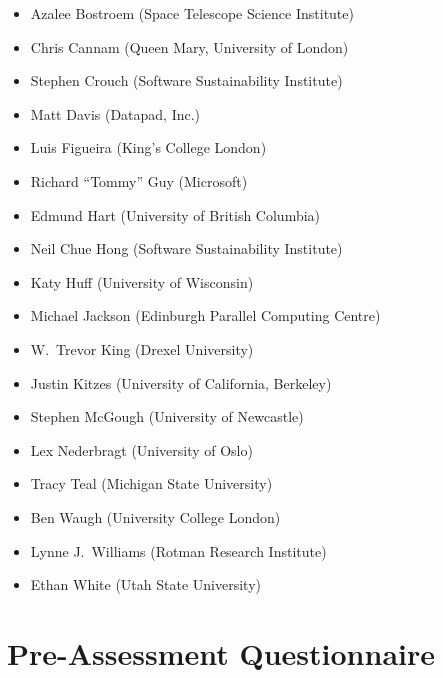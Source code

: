 \documentclass[10pt,a4paper,twocolumn]{article}
\begin{document}
\begin{itemize}
\item
  Azalee Bostroem (Space Telescope Science Institute)
\item
  Chris Cannam (Queen Mary, University of London)
\item
  Stephen Crouch (Software Sustainability Institute)
\item
  Matt Davis (Datapad, Inc.)
\item
  Luis Figueira (King's College London)
\item
  Richard ``Tommy'' Guy (Microsoft)
\item
  Edmund Hart (University of British Columbia)
\item
  Neil Chue Hong (Software Sustainability Institute)
\item
  Katy Huff (University of Wisconsin)
\item
  Michael Jackson (Edinburgh Parallel Computing Centre)
\item
  W.\ Trevor King (Drexel University)
\item
  Justin Kitzes (University of California, Berkeley)
\item
  Stephen McGough (University of Newcastle)
\item
  Lex Nederbragt (University of Oslo)
\item
  Tracy Teal (Michigan State University)
\item
  Ben Waugh (University College London)
\item
  Lynne J.\ Williams (Rotman Research Institute)
\item
  Ethan White (Utah State University)
\end{itemize}

\nocite{*}
{\small
}

\appendix

\section{Pre-Assessment Questionnaire}
\end{document}
